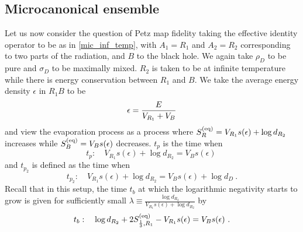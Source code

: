\documentclass[a4paper,11pt]{article}
\newcommand{\be}{\begin{equation}}
\newcommand{\ee}{\end{equation}}
\newcommand\ep{\epsilon}
\newcommand\ov{\over}
\begin{document}
\begin{enumerate}
\begin{appendix}
\subsection{Microcanonical ensemble}
\label{petz_app_mic}
Let us now consider the question of Petz map fidelity taking the effective identity operator to be as in \eqref{mic_inf_temp}, with $A_1= R_1$ and $A_2=R_2$ corresponding to two parts of the radiation, and $B$ to the black hole. We again take $\rho_D$ to be pure and $\sigma_D$ to be maximally mixed. $R_2$ is taken to be at infinite temperature while there is energy conservation between $R_1$ and $B$. We take the average energy density $\ep$ in $R_1 B$ to be 
\be 
\ep = {E \ov V_{R_1} + V_B} 
\ee
and view the evaporation process as a process where $S_R^{(\rm eq)} = V_{R_1} s (\ep) + \log d_{R_2}$ increases
while $S_B^{(\rm eq)} = V_B s (\ep)$ decreases. $t_p$ is the time when 
\be 
t_p : \quad V_{R_1} s ( \ep) + \log d_{R_2} = V_B s ( \ep) \ \label{tp_mic}
\ee
and 
 $t_{p_2}$ is defined as the time when 
\be 
t_{p_2}: \quad V_{R_1} s (\ep) + \log d_{R_2} = V_B s (\ep) + \log d_D \ .
\ee
Recall that in this setup, the time $t_b$ at which the logarithmic negativity starts to grow is given for sufficiently small $\lambda \equiv \frac{\log d_{R_2}}{V_{R_1} s(\epsilon) + \log d_{R_2}}$ by 
\be \label{uhs}
t_b: \quad \log d_{R_2} + 2 S_{{1 \ov 3}, R_1}^{(\rm eq)} - V_{R_1} s ( \ep) = V_B s (\ep) \ . 
\ee


\end{appendix}
\end{enumerate}
\end{document}
